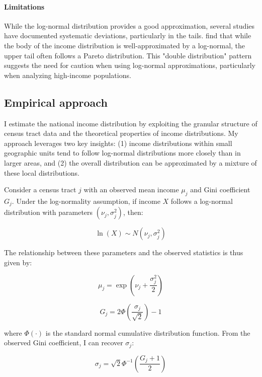 \paragraph{Limitations} While the log-normal distribution provides a good approximation, several studies have documented systematic deviations, particularly in the tails. \cite{clementi2016some} find that while the body of the income distribution is well-approximated by a log-normal, the upper tail often follows a Pareto distribution. This "double distribution" pattern suggests the need for caution when using log-normal approximations, particularly when analyzing high-income populations.

\subsection{Empirical approach}

I estimate the national income distribution by exploiting the granular structure of census tract data and the theoretical properties of income distributions. My approach leverages two key insights: (1) income distributions within small geographic units tend to follow log-normal distributions more closely than in larger areas, and (2) the overall distribution can be approximated by a mixture of these local distributions.

Consider a census tract $j$ with an observed mean income $\mu_j$ and Gini coefficient $G_j$. Under the log-normality assumption, if income $X$ follows a log-normal distribution with parameters $(\nu_j, \sigma_j^2)$, then:

\begin{equation}
\ln(X) \sim N(\nu_j, \sigma_j^2)
\end{equation}

The relationship between these parameters and the observed statistics is thus given by:

\begin{equation}
\mu_j = \exp\left(\nu_j + \frac{\sigma_j^2}{2}\right)
\end{equation}

\begin{equation}
G_j = 2\Phi\left(\frac{\sigma_j}{\sqrt{2}}\right) - 1
\end{equation}

where $\Phi(\cdot)$ is the standard normal cumulative distribution function. From the observed Gini coefficient, I can recover $\sigma_j$:

\begin{equation}
\sigma_j = \sqrt{2}\Phi^{-1}\left(\frac{G_j + 1}{2}\right)
\end{equation}

